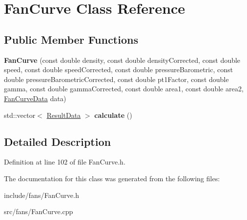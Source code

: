 \hypertarget{class_fan_curve}{}\section{Fan\+Curve Class Reference}
\label{class_fan_curve}
\subsection*{Public Member Functions}
\begin{DoxyCompactItemize}
\item 
\mbox{\label{class_fan_curve_aadde731da2ac3cd6a924e6d23454f3f7}} 
{\bfseries Fan\+Curve} (const double density, const double density\+Corrected, const double speed, const double speed\+Corrected, const double pressure\+Barometric, const double pressure\+Barometric\+Corrected, const double pt1\+Factor, const double gamma, const double gamma\+Corrected, const double area1, const double area2, \hyperlink{class_fan_curve_data}{Fan\+Curve\+Data} data)
\item 
\mbox{\label{class_fan_curve_acd1ec595f476b74718479bbb66e778ec}} 
std\+::vector$<$ \hyperlink{class_result_data}{Result\+Data} $>$ {\bfseries calculate} ()
\end{DoxyCompactItemize}


\subsection{Detailed Description}


Definition at line 102 of file Fan\+Curve.\+h.



The documentation for this class was generated from the following files\+:\begin{DoxyCompactItemize}
\item 
include/fans/Fan\+Curve.\+h\item 
src/fans/Fan\+Curve.\+cpp\end{DoxyCompactItemize}
